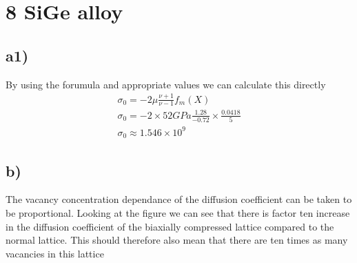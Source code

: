 \documentclass[a4paper, 11pt]{article}
\begin{document}
		\section{8 SiGe alloy}
			\subsection{a1)}
				By using the forumula and appropriate values we can calculate this directly
				\begin{align*}
					\sigma_0 = -2\mu\frac{\nu+1}{\nu-1}f_m(X)\\
					\sigma_0 = -2\times52GPa\frac{1.28}{-0.72}\times \frac{0.0418}{5}\\
					\sigma_0 \approx 1.546\times 10^9
				\end{align*}
			\subsection{b)}
				The vacancy concentration dependance of the diffusion coefficient can be taken to be proportional.
				Looking at the figure we can see that there is factor ten increase in the diffusion coefficient of the biaxially compressed lattice compared to the normal lattice. This should therefore also mean that there are ten times as many vacancies in this lattice
\end{document}
